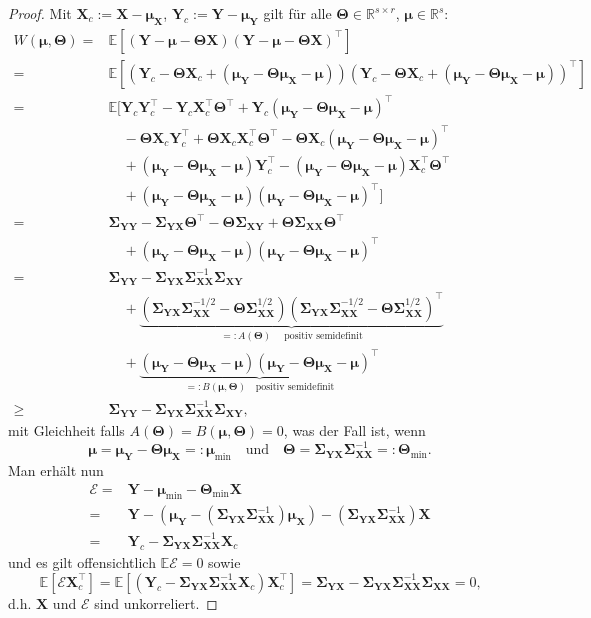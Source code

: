 \documentclass[]{article}
\newcommand{\E}{\mathbb{E}}
\newcommand{\R}{\mathbb{R}}
\newcommand{\X}{\mathbf{X}}
\newcommand{\Y}{\mathbf{Y}}
\newcommand{\T}{\mathbf{\Theta}}
\newcommand{\muu}{\bm{\mu}}
\newcommand{\Ssigma}{\mathbf{\Sigma}}
\begin{document}
\begin{proof}
	Mit $\X_c := \X - \muu_\X$, $\Y_c := \Y - \muu_\Y$ gilt für alle $\T \in \R^{s \times r}$, $\muu \in \R^s$:
	\begin{align*}
		W(\muu, \T) ={}& \E[(\Y - \muu - \T \X)(\Y - \muu - \T \X)^\top] \\
		={}& \E[(\Y_c - \T \X_c + (\muu_\Y - \T \muu_\X - \muu))(\Y_c - \T \X_c + (\muu_\Y - \T \muu_\X - \muu))^\top] \\
		={}& \E[\Y_c \Y_c^\top - \Y_c \X_c^\top \T^\top + \Y_c (\muu_\Y - \T \muu_\X - \muu)^\top \\
		& \quad - \T \X_c \Y_c^\top + \T \X_c \X_c^\top \T^\top - \T \X_c (\muu_\Y - \T \muu_\X - \muu)^\top \\
		& \quad + (\muu_\Y - \T \muu_\X - \muu) \Y_c^\top - (\muu_\Y - \T \muu_\X - \muu) \X_c^\top \T^\top \\
		& \quad + (\muu_\Y - \T \muu_\X - \muu)(\muu_\Y - \T \muu_\X - \muu)^\top] \\
		={}& \Ssigma_{\Y\Y} - \Ssigma_{\Y\X} \T^\top - \T \Ssigma_{\X\Y} + \T \Ssigma_{\X\X} \T^\top \\
		& \quad + (\muu_\Y - \T \muu_\X - \muu)(\muu_\Y - \T \muu_\X - \muu)^\top \\
		={}& \Ssigma_{\Y\Y} - \Ssigma_{\Y\X} \Ssigma_{\X\X}^{-1} \Ssigma_{\X\Y} \\
		& \quad + \underbrace{(\Ssigma_{\Y\X} \Ssigma_{\X\X}^{-1/2} - \T \Ssigma_{\X\X}^{1/2})(\Ssigma_{\Y\X} \Ssigma_{\X\X}^{-1/2} - \T \Ssigma_{\X\X}^{1/2})^\top}_{=: A(\T) \quad \text{ positiv semidefinit}} \\
		& \quad + \underbrace{(\muu_\Y - \T \muu_\X - \muu)(\muu_\Y - \T \muu_\X - \muu)^\top}_{=:B(\muu, \T) \quad \text{positiv semidefinit}} \\
		\geq{}& \Ssigma_{\Y\Y} - \Ssigma_{\Y\X} \Ssigma_{\X\X}^{-1} \Ssigma_{\X\Y} \text{,}
	\end{align*}
	mit Gleichheit falls $A(\T) = B(\muu, \T) = 0$, was der Fall ist, wenn
	$$ \muu = \muu_\Y - \T \muu_\X =: \muu_{\min} \quad \text{und} \quad \T = \Ssigma_{\Y\X} \Ssigma_{\X\X}^{-1} =: \T_{\min} \text{.}$$
	Man erhält nun
	\begin{align*}
		\mathcal{E} ={}& \Y - \muu_{\min} - \T_{\min} \X \\
		={}& \Y - (\muu_\Y - (\Ssigma_{\Y\X} \Ssigma_{\X\X}^{-1}) \muu_\X) - (\Ssigma_{\Y\X} \Ssigma_{\X\X}^{-1}) \X \\
		={}& \Y_c - \Ssigma_{\Y\X} \Ssigma_{\X\X}^{-1} \X_c
	\end{align*}
	und es gilt offensichtlich $\E \mathcal{E} = 0$ sowie
	$$\E[\mathcal{E} \X_c^\top] = \E[(\Y_c - \Ssigma_{\Y\X} \Ssigma_{\X\X}^{-1} \X_c) \X_c^\top] = \Ssigma_{\Y\X} - \Ssigma_{\Y\X}\Ssigma_{\X\X}^{-1} \Ssigma_{\X\X} = 0 \text{,}$$
	d.h. $\X$ und $\mathcal{E}$ sind unkorreliert.
\end{proof}
\end{document}
